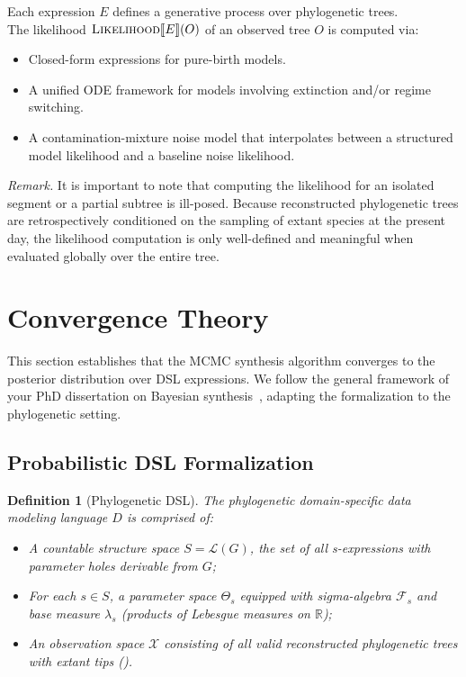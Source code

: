 \documentclass[11pt,a4paper]{article}
\newtheorem{definition}{Definition}[section]
\newcommand{\LL}{\mathcal{L}}
\newcommand{\XX}{\mathcal{X}}
\newcommand{\Likelihood}{\textsc{Likelihood}}
\newcommand{\sem}[1]{\llbracket #1 \rrbracket}
\begin{document}
Each expression $E$ defines a generative process over phylogenetic
trees. \\
The likelihood $\Likelihood\sem{E}(O)$ of an observed tree $O$
is computed via:
\begin{itemize}[nosep]
  \item Closed-form expressions for pure-birth models.
  \item A unified ODE framework for models involving extinction and/or
    regime switching.
  \item A contamination-mixture noise model that interpolates between a
    structured model likelihood and a baseline noise likelihood.
\end{itemize}
\emph{Remark.} It is important to note that computing the likelihood for an isolated segment or a partial subtree is ill-posed. 
Because reconstructed phylogenetic trees are retrospectively conditioned on the sampling of extant species at the present day, the likelihood computation is only well-defined and meaningful when evaluated globally over the entire tree.
\section{Convergence Theory}\label{sec:convergence}

This section establishes that the MCMC synthesis algorithm
converges to the posterior distribution over DSL expressions.  We
follow the general framework of your PhD dissertation on Bayesian synthesis~\cite{saad2023}, adapting the
formalization to the phylogenetic setting.

\subsection{Probabilistic DSL Formalization}

\begin{definition}[Phylogenetic DSL]\label{def:dsl}
The phylogenetic domain-specific data modeling language $D$ is comprised
of:
\begin{itemize}[nosep]
  \item A countable structure space $S = \LL(G)$, the set of all
    s-expressions with parameter holes derivable from $G$;
  \item For each $s \in S$, a parameter space $\Theta_s$ equipped with
    sigma-algebra $\mathcal{F}_s$ and base measure $\lambda_s$ (products
    of Lebesgue measures on $\mathbb{R}$);
  \item An observation space $\XX$ consisting of all valid reconstructed
    phylogenetic trees with extant tips ().
\end{itemize}
\end{definition}
\end{document}
